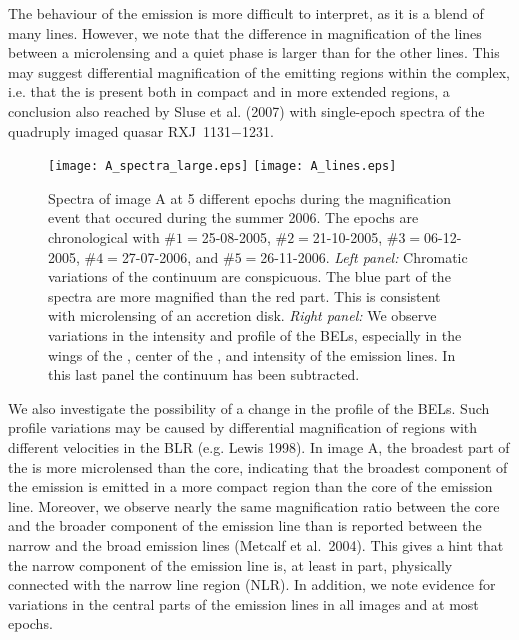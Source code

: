 \documentclass{PoS}
\begin{document}
The behaviour of the  emission is
more difficult to interpret, as it is a blend of many
lines. 
However, we note that 
the  difference  in  magnification of  the 
lines between a microlensing and a quiet  phase is larger than for the
other   lines.  This  may suggest  differential   magnification of the
emitting regions within the  complex, i.e. that the
 is present both in compact and in more extended regions,
a conclusion also reached by Sluse et al. (2007) with single-epoch spectra
of the quadruply imaged quasar RXJ~1131$-$1231.



\begin{figure}
\texttt{[image: A\_spectra\_large.eps]}
\hspace{-0.7cm}
\texttt{[image: A\_lines.eps]}
\caption{Spectra of image A at 5 different epochs during the 
magnification event that occured during the summer 2006.
The epochs are chronological with
\#$1=$25-08-2005, 
\#$2=$21-10-2005, 
\#$3=$06-12-2005, 
\#$4=$27-07-2006, and 
\#$5=$26-11-2006. 
\emph{Left panel:} Chromatic variations of the continuum are conspicuous. The blue part
of the spectra are more magnified than the red part. This is consistent with
microlensing of an accretion disk.
\emph{Right panel:} We observe variations in the intensity and profile of the BELs, especially
in the wings of the \ion{C}{III]}, center of the , and intensity of the 
emission lines. In this last panel the continuum has been subtracted.}
\label{fig1}
\end{figure}


We also  investigate  the
possibility of a change in the profile of the BELs.  
Such profile variations may
be  caused by  differential  magnification of  regions with  different
velocities in the BLR  
(e.g. Lewis 1998).  
In image A, 
the broadest part of the \ion{C}{III]} is
more microlensed than the core, indicating that the broadest component
of the \ion{C}{III]} emission is emitted in a more compact region than
the core of the emission line.
Moreover, we observe
nearly the same  magnification ratio between  the core and the broader
component of the \ion{C}{III]} emission line  than is reported between the narrow
\ion{[O}{III]} and  the broad  emission lines (Metcalf
et al.~2004). This gives a hint that 
the narrow component of the \ion{C}{III]} emission line 
is, at least in part, physically connected with 
the narrow line region (NLR).
In addition, we note evidence for variations in the central parts of
the  emission   lines in  all  images and at
most  epochs.  
\end{document}
